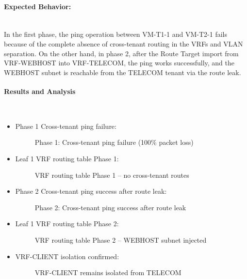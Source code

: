 \paragraph{Expected Behavior:}~\\
In the first phase, the ping operation between VM-T1-1 and VM-T2-1 fails because of the complete absence of cross-tenant routing in the VRFs and VLAN separation. On the other hand, in phase 2, after the Route Target import from VRF-WEBHOST into VRF-TELECOM, the ping works successfully, and the WEBHOST subnet is reachable from the TELECOM tenant via the route leak.

\paragraph{Results and Analysis}~\\
\begin{itemize}
    \item []Phase 1 Cross-tenant ping failure:
    \newpage
    \begin{figure}[!htbp]
        \centering
        \corsstenatfa
        \caption{Phase 1: Cross-tenant ping failure (100\% packet loss)}
        \label{fig:phase1-ping-fail}
    \end{figure}
    \item []Leaf 1 VRF routing table Phase 1:
    \begin{figure}[!htbp]
        \centering
        \pahesI
        \caption{VRF routing table Phase 1 – no cross-tenant routes}
        \label{fig:phase1-vrf-table}
    \end{figure}
    \item []Phase 2 Cross-tenant ping success after route leak:
    \begin{figure}[!htbp]
        \centering
        \corsstenat
        \caption{Phase 2: Cross-tenant ping success after route leak}
        \label{fig:phase2-ping-success}
    \end{figure}
    \item []Leaf 1 VRF routing table Phase 2:
    \begin{figure}[!htbp]
        \centering
        \phaseII
        \caption{VRF routing table Phase 2 – WEBHOST subnet injected}
        \label{fig:phase2-vrf-table}
    \end{figure}
    \item []VRF-CLIENT isolation confirmed:
    \begin{figure}[!htbp]
        \centering
        \VRFCLIENT
        \caption{VRF-CLIENT remains isolated from TELECOM}
        \label{fig:vrf-client-isolation}
    \end{figure}
\end{itemize}
